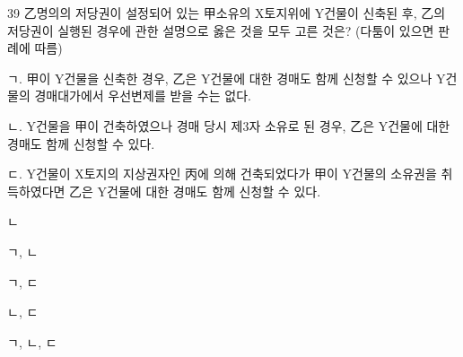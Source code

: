 \begin{question}{39}
乙명의의 저당권이 설정되어 있는 甲소유의 X토지위에 Y건물이 신축된 후, 乙의 저당권이 실행된 경우에 관한 설명으로 옳은 것을 모두 고른 것은? (다툼이 있으면 판례에 따름)
\begin{framedtext}
ㄱ. 甲이 Y건물을 신축한 경우, 乙은 Y건물에 대한 경매도 함께 신청할 수 있으나 Y건물의 경매대가에서 우선변제를 받을 수는 없다. \par
ㄴ. Y건물을 甲이 건축하였으나 경매 당시 제3자 소유로 된 경우, 乙은 Y건물에 대한 경매도 함께 신청할 수 있다. \par
ㄷ. Y건물이 X토지의 지상권자인 丙에 의해 건축되었다가 甲이 Y건물의 소유권을 취득하였다면 乙은 Y건물에 대한 경매도 함께 신청할 수 있다. \par
\end{framedtext}
\begin{choices}
  \item ㄴ
  \item ㄱ, ㄴ
  \item ㄱ, ㄷ
  \item ㄴ, ㄷ
  \item ㄱ, ㄴ, ㄷ
\end{choices}
\end{question}
